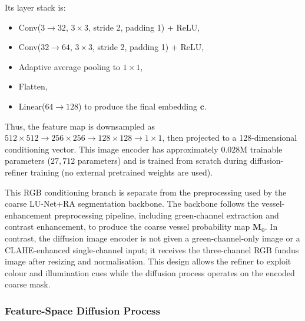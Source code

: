 \documentclass[jimaging,article,submit,pdftex,moreauthors]
  {Definitions/mdpi}
\begin{document}
Its layer stack is:
\begin{itemize}
  \item Conv($3\rightarrow32$, $3\times3$, stride 2, padding 1) + ReLU,
  \item Conv($32\rightarrow64$, $3\times3$, stride 2, padding 1) + ReLU,
  \item Adaptive average pooling to $1\times1$,
  \item Flatten,
  \item Linear($64\rightarrow128$) to produce the final embedding $\mathbf{c}$.
\end{itemize}

Thus, the feature map is downsampled as $512\times512\rightarrow256\times256\rightarrow128\times128\rightarrow1\times1$, then projected to a 128-dimensional conditioning vector. This image encoder has approximately $0.028$M trainable parameters ($27{,}712$ parameters) and is trained from scratch during diffusion-refiner training (no external pretrained weights are used).

This RGB conditioning branch is separate from the preprocessing used by the coarse LU-Net+RA segmentation backbone. The backbone follows the vessel-enhancement preprocessing pipeline, including green-channel extraction and contrast enhancement, to produce the coarse vessel probability map $\mathbf{M}_0$. In contrast, the diffusion image encoder is not given a green-channel-only image or a CLAHE-enhanced single-channel input; it receives the three-channel RGB fundus image after resizing and normalisation. This design allows the refiner to exploit colour and illumination cues while the diffusion process operates on the encoded coarse mask.
\subsubsection{Feature-Space Diffusion Process}
\end{document}
